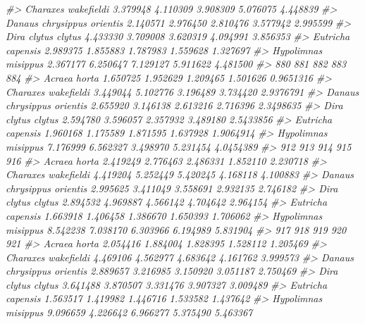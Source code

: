 \documentclass[
]{article}
\newenvironment{Shaded}{\begin{snugshade}}{\end{snugshade}}
\newcommand{\CommentTok}[1]{\textcolor[rgb]{0.56,0.35,0.01}{\textit{#1}}}
\begin{document}
\begin{Shaded}
\begin{Highlighting}[]
\CommentTok{\#\textgreater{} Charaxes wakefieldi        3.379948 4.110309 3.908309 5.076075 4.448839}
\CommentTok{\#\textgreater{} Danaus chrysippus orientis 2.140571 2.976450 2.810476 3.577942 2.995599}
\CommentTok{\#\textgreater{} Dira clytus clytus         4.433330 3.709008 3.620319 4.094991 3.856353}
\CommentTok{\#\textgreater{} Eutricha capensis          2.989375 1.855883 1.787983 1.559628 1.327697}
\CommentTok{\#\textgreater{} Hypolimnas misippus        2.367177 6.250647 7.129127 5.911622 4.481500}
\CommentTok{\#\textgreater{}                                 880      881      882      883       884}
\CommentTok{\#\textgreater{} Acraea horta               1.650725 1.952629 1.209465 1.501626 0.9651316}
\CommentTok{\#\textgreater{} Charaxes wakefieldi        3.449044 5.102776 3.196489 3.734420 2.9376791}
\CommentTok{\#\textgreater{} Danaus chrysippus orientis 2.655920 3.146138 2.613216 2.716396 2.3498635}
\CommentTok{\#\textgreater{} Dira clytus clytus         2.594780 3.596057 2.357932 3.489180 2.5433856}
\CommentTok{\#\textgreater{} Eutricha capensis          1.960168 1.175589 1.871595 1.637928 1.9064914}
\CommentTok{\#\textgreater{} Hypolimnas misippus        7.176999 6.562327 3.498970 5.231454 4.0454389}
\CommentTok{\#\textgreater{}                                 912      913      914      915      916}
\CommentTok{\#\textgreater{} Acraea horta               2.419249 2.776463 2.486331 1.852110 2.230718}
\CommentTok{\#\textgreater{} Charaxes wakefieldi        4.419204 5.252449 5.420245 4.168118 4.100883}
\CommentTok{\#\textgreater{} Danaus chrysippus orientis 2.995625 3.411049 3.558691 2.932135 2.746182}
\CommentTok{\#\textgreater{} Dira clytus clytus         2.894532 4.969887 4.566142 4.704642 2.964154}
\CommentTok{\#\textgreater{} Eutricha capensis          1.663918 1.406458 1.386670 1.650393 1.706062}
\CommentTok{\#\textgreater{} Hypolimnas misippus        8.542238 7.038170 6.303966 6.194989 5.831904}
\CommentTok{\#\textgreater{}                                 917      918      919      920      921}
\CommentTok{\#\textgreater{} Acraea horta               2.054416 1.884004 1.828395 1.528112 1.205469}
\CommentTok{\#\textgreater{} Charaxes wakefieldi        4.469106 4.562977 4.683642 4.161762 3.999573}
\CommentTok{\#\textgreater{} Danaus chrysippus orientis 2.889657 3.216985 3.150920 3.051187 2.750469}
\CommentTok{\#\textgreater{} Dira clytus clytus         3.641488 3.870507 3.331476 3.907327 3.009489}
\CommentTok{\#\textgreater{} Eutricha capensis          1.563517 1.419982 1.446716 1.533582 1.437642}
\CommentTok{\#\textgreater{} Hypolimnas misippus        9.096659 4.226642 6.966277 5.375490 5.463367}

\end{Highlighting}
\end{Shaded}
\end{document}
